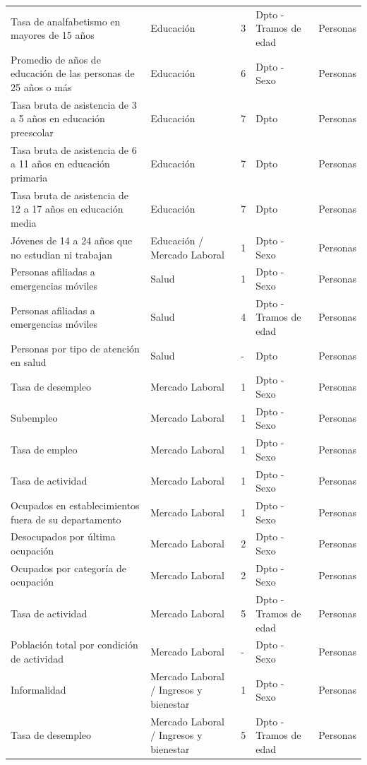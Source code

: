 \documentclass[12pt,twoside,spanish,a4paper]{book}\usepackage[]{graphicx}\usepackage[]{color}
\begin{document}
\begin{appendix}
\begin{longtable}{p{2in}|p{1in}|p{0.5in}|p{1in}|p{0.5in}}
  Tasa de analfabetismo en mayores de 15 años & Educación & 3 & Dpto - Tramos de edad  & Personas \\ 
  Promedio de años de educación de las personas de 25 años o más & Educación & 6 & Dpto - Sexo  & Personas \\ 
  Tasa bruta de asistencia de 3 a 5 años en educación preescolar & Educación & 7 & Dpto & Personas \\ 
  Tasa bruta de asistencia de 6 a 11 años en educación primaria & Educación & 7 & Dpto  & Personas \\ 
  Tasa bruta de asistencia de 12 a 17 años en educación media & Educación & 7 & Dpto  & Personas \\ 
  Jóvenes de 14 a 24 años que no estudian ni trabajan & Educación / Mercado Laboral & 1 & Dpto - Sexo  & Personas \\ 
  Personas afiliadas a emergencias móviles & Salud & 1 & Dpto - Sexo  & Personas \\ 
  Personas afiliadas a emergencias móviles & Salud & 4 & Dpto - Tramos de edad  & Personas \\ 
  Personas por tipo de atención en salud & Salud & - & Dpto  & Personas \\ 
  Tasa de desempleo & Mercado Laboral & 1 & Dpto - Sexo  & Personas \\ 
  Subempleo & Mercado Laboral & 1 & Dpto - Sexo  & Personas \\ 
  Tasa de empleo & Mercado Laboral & 1 & Dpto - Sexo  & Personas \\ 
  Tasa de actividad & Mercado Laboral & 1 & Dpto - Sexo  & Personas \\ 
  Ocupados en establecimientos fuera de su departamento  & Mercado Laboral & 1 & Dpto - Sexo  & Personas \\ 
  Desocupados por última ocupación & Mercado Laboral & 2 & Dpto - Sexo  & Personas \\ 
  Ocupados por categoría de ocupación & Mercado Laboral & 2 & Dpto - Sexo  & Personas \\ 
  Tasa de actividad & Mercado Laboral & 5 & Dpto - Tramos de edad  & Personas \\ 
  Población total por condición de actividad & Mercado Laboral & - & Dpto - Sexo  & Personas \\ 
  Informalidad & Mercado Laboral / Ingresos y bienestar & 1 & Dpto - Sexo  & Personas \\ 
  Tasa de desempleo & Mercado Laboral / Ingresos y bienestar & 5 & Dpto - Tramos de edad  & Personas \\ 

\end{longtable}
\end{appendix}
\end{document}
